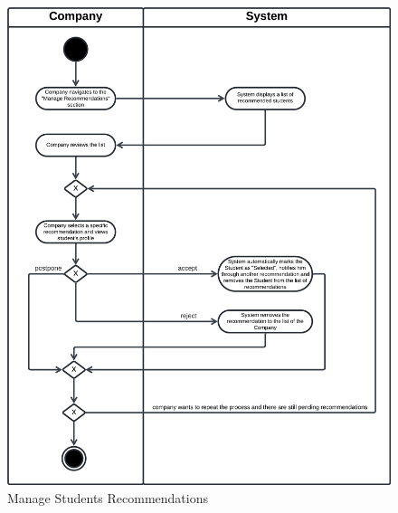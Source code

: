 \begin{figure}[H]
    \begin{center}
         \includegraphics[width=1\linewidth]{LaTeXCode/images/activity diagram/UC12.png}
         \caption{Manage Students Recommendations}
         \label{fig:manage_students_recommendations_ad}
     \end{center}
\end{figure}

\newpage

